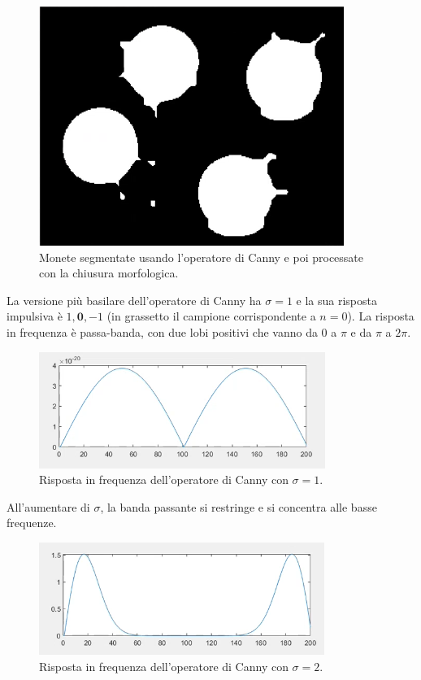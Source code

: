 \documentclass[a4paper,11pt]{article}
\begin{document}
\renewcommand{\thefigure}{10.2}
\begin{figure}[!h]
  \centering
    \includegraphics[scale=0.5]{images/10/coins_segmented_and_closed.png}
    \caption{Monete segmentate usando l'operatore di Canny e poi processate con la chiusura morfologica.}
\end{figure}

La versione più basilare dell'operatore di Canny ha $\sigma = 1$ e la sua risposta impulsiva è ${1, \mathbf{0}, -1}$ (in grassetto il campione
corrispondente a $n=0$). La risposta in frequenza è passa-banda, con due lobi positivi che vanno da 0 a $\pi$ e da $\pi$ a $2\pi$.

\renewcommand{\thefigure}{10.3}
\begin{figure}[!h]
  \centering
    \includegraphics[scale=0.7]{images/10/canny_sigma=1_frresp.png}
    \caption{Risposta in frequenza dell'operatore di Canny con $\sigma=1$.}
\end{figure}

All'aumentare di $\sigma$, la banda passante si restringe e si concentra alle basse frequenze.

\renewcommand{\thefigure}{10.4}
\begin{figure}[!h]
  \centering
    \includegraphics[scale=0.7]{images/10/canny_sigma=2_frresp.png}
    \caption{Risposta in frequenza dell'operatore di Canny con $\sigma=2$.}
\end{figure}
\end{document}
